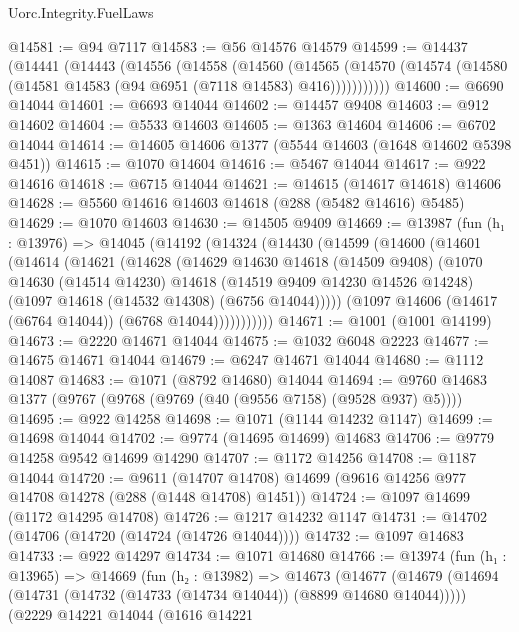 \begin{lexlean}{Uorc.Integrity.FuelLaws}
\begin{coremodule}
@14581 := @94 @7117
@14583 := @56 @14576 @14579
@14599 := @14437
    (@14441
      (@14443
        (@14556
          (@14558
            (@14560
              (@14565
                (@14570 (@14574 (@14580 (@14581 @14583 (@94 @6951 (@7118 @14583) @416)))))))))))
@14600 := @6690 @14044
@14601 := @6693 @14044
@14602 := @14457 @9408
@14603 := @912 @14602
@14604 := @5533 @14603
@14605 := @1363 @14604
@14606 := @6702 @14044
@14614 := @14605 @14606 @1377 (@5544 @14603 (@1648 @14602 @5398 @451))
@14615 := @1070 @14604
@14616 := @5467 @14044
@14617 := @922 @14616
@14618 := @6715 @14044
@14621 := @14615 (@14617 @14618) @14606
@14628 := @5560 @14616 @14603 @14618 (@288 (@5482 @14616) @5485)
@14629 := @1070 @14603
@14630 := @14505 @9409
@14669 := @13987
    (fun (h₁ : @13976) =>
    @14045
      (@14192
        (@14324
          (@14430
            (@14599
              (@14600
                (@14601
                  (@14614
                    (@14621
                      (@14628
                        (@14629
                          @14630
                          @14618
                          (@14509 @9408)
                          (@1070
                            @14630
                            (@14514 @14230)
                            @14618
                            (@14519 @9409 @14230 @14526 @14248)
                            (@1097 @14618 (@14532 @14308) (@6756 @14044)))))
                      (@1097 @14606 (@14617 (@6764 @14044)) (@6768 @14044)))))))))))
@14671 := @1001 (@1001 @14199)
@14673 := @2220 @14671 @14044
@14675 := @1032 @6048 @2223
@14677 := @14675 @14671 @14044
@14679 := @6247 @14671 @14044
@14680 := @1112 @14087
@14683 := @1071 (@8792 @14680) @14044
@14694 := @9760 @14683 @1377 (@9767 (@9768 (@9769 (@40 (@9556 @7158) (@9528 @937) @5))))
@14695 := @922 @14258
@14698 := @1071 (@1144 @14232 @1147)
@14699 := @14698 @14044
@14702 := @9774 (@14695 @14699) @14683
@14706 := @9779 @14258 @9542 @14699 @14290
@14707 := @1172 @14256
@14708 := @1187 @14044
@14720 := @9611 (@14707 @14708) @14699 (@9616 @14256 @977 @14708 @14278 (@288 (@1448 @14708) @1451))
@14724 := @1097 @14699 (@1172 @14295 @14708)
@14726 := @1217 @14232 @1147
@14731 := @14702 (@14706 (@14720 (@14724 (@14726 @14044))))
@14732 := @1097 @14683
@14733 := @922 @14297
@14734 := @1071 @14680
@14766 := @13974
    (fun (h₁ : @13965) =>
    @14669
      (fun (h₂ : @13982) =>
      @14673
        (@14677
          (@14679 (@14694 (@14731 (@14732 (@14733 (@14734 @14044)) (@8899 @14680 @14044)))))
          (@2229
            @14221
            @14044
            (@1616
              @14221

\end{coremodule}
\end{lexlean}
